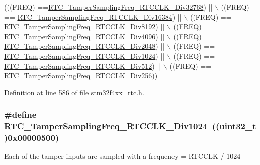 \begin{DoxyCode}
(((FREQ) ==\hyperlink{group___r_t_c___tamper___sampling___frequencies___definitions_ga8111f838f023394683814baebbd6a018}{RTC\_TamperSamplingFreq\_RTCCLK\_Div32768}) || \(\backslash\)
                                           ((FREQ) ==
      \hyperlink{group___r_t_c___tamper___sampling___frequencies___definitions_ga4ecb6f350e1f309458365ac4d9d3775d}{RTC\_TamperSamplingFreq\_RTCCLK\_Div16384}) || \(\backslash\)
                                           ((FREQ) ==
      \hyperlink{group___r_t_c___tamper___sampling___frequencies___definitions_ga63de5a2c30540bd2b0d6bd9074f1c650}{RTC\_TamperSamplingFreq\_RTCCLK\_Div8192}) || \(\backslash\)
                                           ((FREQ) ==
      \hyperlink{group___r_t_c___tamper___sampling___frequencies___definitions_ga07cc43608fbf68df4159b0e4d759feeb}{RTC\_TamperSamplingFreq\_RTCCLK\_Div4096}) || \(\backslash\)
                                           ((FREQ) ==
      \hyperlink{group___r_t_c___tamper___sampling___frequencies___definitions_ga4bc9217c856fc9e4dc15c83f826d67ba}{RTC\_TamperSamplingFreq\_RTCCLK\_Div2048}) || \(\backslash\)
                                           ((FREQ) ==
      \hyperlink{group___r_t_c___tamper___sampling___frequencies___definitions_ga39c88776ba8589000ab94b6d5da5de90}{RTC\_TamperSamplingFreq\_RTCCLK\_Div1024}) || \(\backslash\)
                                           ((FREQ) ==
      \hyperlink{group___r_t_c___tamper___sampling___frequencies___definitions_ga8528f31207c85d0ed76c9678f11e7e49}{RTC\_TamperSamplingFreq\_RTCCLK\_Div512}) || \(\backslash\)
                                           ((FREQ) ==
      \hyperlink{group___r_t_c___tamper___sampling___frequencies___definitions_gad0f904e57e4d060e005a5bbceceb51f7}{RTC\_TamperSamplingFreq\_RTCCLK\_Div256}))
\end{DoxyCode}


Definition at line 586 of file stm32f4xx\-\_\-rtc.\-h.

\hypertarget{group___r_t_c___tamper___sampling___frequencies___definitions_ga39c88776ba8589000ab94b6d5da5de90}{
\subsubsection[{R\-T\-C\-\_\-\-Tamper\-Sampling\-Freq\-\_\-\-R\-T\-C\-C\-L\-K\-\_\-\-Div1024}]{\setlength{\rightskip}{0pt plus 5cm}\#define R\-T\-C\-\_\-\-Tamper\-Sampling\-Freq\-\_\-\-R\-T\-C\-C\-L\-K\-\_\-\-Div1024~((uint32\-\_\-t)0x00000500)}}\label{group___r_t_c___tamper___sampling___frequencies___definitions_ga39c88776ba8589000ab94b6d5da5de90}
Each of the tamper inputs are sampled with a frequency = R\-T\-C\-C\-L\-K / 1024 

